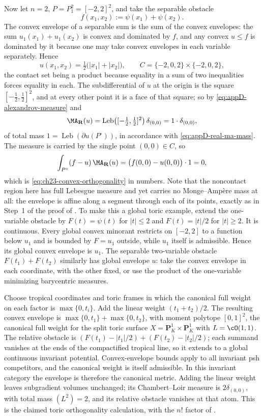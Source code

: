 \begin{example}
Now let $n=2$, $P=P_1^2=[-2,2]^2$, and take the separable obstacle
\[
 f(x_1,x_2):=\psi(x_1)+\psi(x_2).
\]
The convex envelope of a separable sum is the sum of the convex envelopes:
the sum $u_1(x_1)+u_1(x_2)$ is convex and dominated by $f$, and any
convex $u\leq f$ is dominated by it because one may take convex envelopes
in each variable separately.  Hence
\[
 u(x_1,x_2)=\tfrac12\bigl(|x_1|+|x_2|\bigr),
 \qquad
 C=\{-2,0,2\}\times\{-2,0,2\},
\]
the contact set being a product because equality in a sum of two
inequalities forces equality in each.  The subdifferential of $u$ at the
origin is the square $[-\tfrac12,\tfrac12]^2$, and at every other point it
is a face of that square; so by \eqref{eq:appD-alexandrov-measure} and
\[
 \MA_{\mathbf R}(u)=\operatorname{Leb}\bigl([-\tfrac12,\tfrac12]^2\bigr)
   \,\delta_{(0,0)}=1\cdot\delta_{(0,0)},
\]
of total mass $1=\operatorname{Leb}(\partial u(P^\circ))$, in accordance
with \eqref{eq:appD-real-ma-mass}.  The measure is carried by the single
point $(0,0)\in C$, so
\[
 \int_{P^\circ}(f-u)\,\MA_{\mathbf R}(u)
 =\bigl(f(0,0)-u(0,0)\bigr)\cdot1=0 ,
\]
which is \eqref{eq:ch23-convex-orthogonality} in numbers.  Note that the
noncontact region here has full Lebesgue measure and yet carries no
Monge--Amp\`ere mass at all: the envelope is affine along a segment through
each of its points, exactly as in Step~1 of the proof of
.  To make this a global toric example, extend the one-variable obstacle by
$F(t)=\psi(t)$ for $|t|\leq2$ and $F(t)=|t|/2$ for $|t|\geq2$.
It is continuous.  Every global convex minorant restricts on $[-2,2]$
to a function below $u_1$ and is bounded by $F=u_1$ outside, while $u_1$
itself is admissible.  Hence its global convex envelope is $u_1$.
The separable two-variable obstacle $F(t_1)+F(t_2)$ similarly has global
envelope $u$: take the convex envelope in each coordinate, with the other
fixed, or use the product of the one-variable minimizing barycentric
measures.

Choose tropical coordinates and toric frames in which the canonical full
weight on each factor is $\max\{0,t_i\}$.  Add the linear weight
$(t_1+t_2)/2$.  The resulting convex envelope is
$\max\{0,t_1\}+\max\{0,t_2\}$, with moment polytope $[0,1]^2$,
the canonical full weight for the split toric surface
$X=\mathbf P^1_K\times\mathbf P^1_K$ with $L=\cO(1,1)$.
The relative obstacle is
$(F(t_1)-|t_1|/2)+(F(t_2)-|t_2|/2)$; each summand vanishes at the
ends of the compactified tropical line, so it extends to a global
continuous invariant potential.  Convex-envelope bounds apply to all
invariant psh competitors, and the canonical weight is itself admissible.
In this invariant category the envelope is therefore the canonical
metric.  Adding the linear weight leaves subgradient volumes unchanged;
its Chambert--Loir measure is $2\delta_{(0,0)}$, with total mass
$(L^2)=2$, and its relative obstacle vanishes at that atom.  This is the
claimed toric orthogonality calculation, with the $n!$ factor of
.
\end{example}

